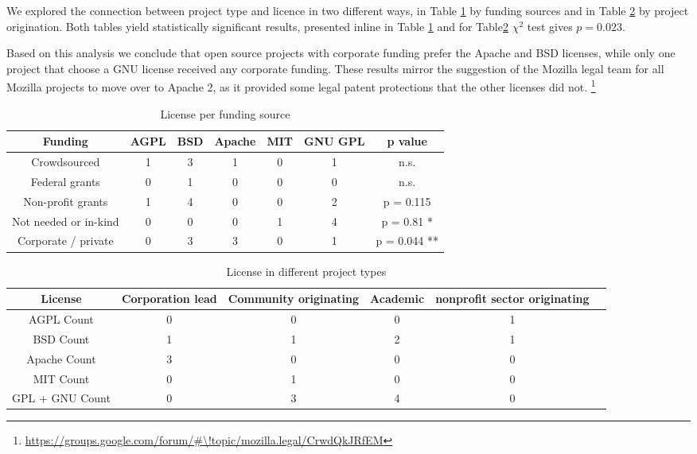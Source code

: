 We explored the connection between project type and licence in two different ways, in Table \ref{tab:licence_per_fudning} by funding sources and in Table \ref{tab:licence_per_project_type} by project origination. Both tables yield statistically significant results, presented inline in Table \ref{tab:licence_per_fudning} and for Table\ref{tab:licence_per_project_type} $\chi^2$ test gives $p=0.023$.

Based on this analysis we conclude that open source projects with corporate funding prefer the Apache and BSD licenses, while only one project that choose a GNU license received any corporate funding. These results mirror the suggestion of the Mozilla legal team for all Mozilla projects to move over to Apache 2, as it provided some legal patent protections that the other licenses did not. \footnote{\url{https://groups.google.com/forum/\#\!topic/mozilla.legal/CrwdQkJRfEM}}

\begin{table}[htbp]
  \centering
  \caption{License per funding source}
    \begin{tabular}{|c|c|c|c|c|c|c|}
    \hline
         Funding & AGPL  & BSD   & Apache & MIT   & GNU GPL & p value \\
\hline
    Crowdsourced & 1     & 3     & 1     & 0     & 1     & n.s. \\
    Federal grants & 0     & 1     & 0     & 0     & 0     & n.s. \\
    Non-profit grants & 1     & 4     & 0     & 0     & 2     & p = 0.115 \\
    Not needed or in-kind & 0     & 0     & 0     & 1     & 4     & p = 0.81 * \\
    Corporate / private & 0     & 3     & 3     & 0     & 1     & p = 0.044 ** \\
\hline    
    \end{tabular}
  \label{tab:licence_per_fudning}
\end{table}

\begin{table}[htbp]
  \centering
  \caption{License in different project types}
    \begin{tabular}{|c|c|c|c|c|c|}
	\hline
          License & Corporation lead & Community originating & Academic & nonprofit sector originating \\
    \hline
    AGPL Count & 0     & 0     & 0     & 1 \\
    BSD  Count & 1     & 1     & 2     & 1 \\
    Apache Count & 3     & 0     & 0     & 0 \\
    MIT  Count & 0     & 1     & 0     & 0 \\
    GPL + GNU Count & 0     & 3     & 4     & 0 \\
    \hline
    \end{tabular}
  \label{tab:licence_per_project_type}
\end{table}%
